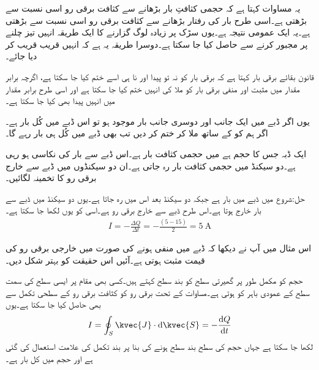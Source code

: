 یہ مساوات کہتا ہے کہ حجمی کثافتِ بار بڑھانے سے کثافت برقی رو اسی نسبت سے بڑھتی ہے۔اسی طرح بار کی رفتار بڑھانے سے کثافت برقی رو اسی نسبت سے بڑھتی ہے۔یہ ایک عمومی نتیجہ ہے۔یوں سڑک پر زیادہ لوگ گزارنے کا ایک طریقہ انہیں تیز چلنے پر مجبور کرنے سے حاصل کیا جا سکتا ہے۔دوسرا طریقہ یہ ہے کہ انہیں قریب قریب کر دیا جائے۔ 


قانون بقائے برقی بار کہتا ہے کہ برقی بار کو نہ تو پیدا  اور نا ہی اسے ختم کیا جا سکتا ہے، اگرچہ برابر مقدار میں مثبت اور منفی برقی بار  کو ملا کی انہیں ختم کیا جا سکتا ہے اور اسی طرح برابر مقدار میں انہیں پیدا بھی کیا جا سکتا ہے۔

یوں اگر ڈبے میں ایک جانب  اور دوسری جانب  بار موجود ہو تو اس ڈبے میں کُل  بار ہے۔اگر ہم   کو   کے ساتھ ملا کر ختم کر دیں تب  بھی ڈبے میں کُل  ہی بار رہے گا۔

ایک ڈبہ جس کا حجم  ہے میں حجمی کثافت بار  ہے۔اس ڈبے سے بار کی نکاسی ہو رہی ہے۔دو سیکنڈ میں حجمی کثافت بار  رہ جاتی ہے۔ان دو سیکنڈوں میں ڈبے سے خارج برقی رو کا تخمینہ لگائیں۔

حل:شروع میں ڈبے میں  بار ہے جبکہ دو سیکنڈ بعد اس میں  رہ جاتا ہے۔یوں دو سیکنڈ میں ڈبے سے  بار خارج ہوتا ہے۔اس طرح  ڈبے سے خارج برقی رو  ہے۔اسی کو یوں لکھا جا سکتا ہے۔
\begin{align*}
I=-\frac{\Delta Q}{\Delta t}=-\frac{(5-15)}{2}=\SI{5}{\ampere}
\end{align*}

اس مثال میں آپ نے دیکھا کہ ڈبے میں  منفی ہونے کی صورت میں خارجی برقی رو کی قیمت مثبت ہوتی ہے۔آئیں اس حقیقت کو بہتر شکل دیں۔

حجم کو مکمل طور پر گھیرتی سطح کو بند سطح کہتے ہیں۔کسی بھی مقام پر ایسی سطح کی سمت سطح کے عمودی باہر کو ہوتی ہے۔مساوات  کے تحت برقی رو کو کثافت برقی رو کے سطحی تکمل سے بھی حاصل کیا جا سکتا ہے۔یوں
\begin{align}\label{مساوات_کپیسٹر_استمراری_مساوات_تکمل_شکل}
I=\oint_S \kvec{J} \cdot \dif \kvec{S}=-\frac{\dif Q}{\dif t}
\end{align}
لکھا جا سکتا ہے جہاں حجم کی سطح بند سطح ہونے کی بنا پر بند تکمل کی علامت استعمال کی گئی ہے اور  حجم میں کل بار ہے۔

